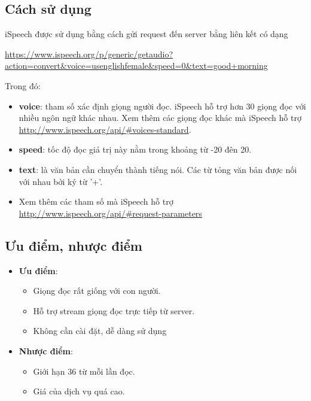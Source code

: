 \subsection{Cách sử dụng}
iSpeech được sử dụng bằng cách gửi request đến server bằng liên kết có dạng

\url{https://www.ispeech.org/p/generic/getaudio?action=convert&voice=usenglishfemale&speed=0&text=good+morning}

Trong đó:
\begin{itemize}
	\item \textbf{voice}:  tham số xác định giọng người đọc. iSpeech hỗ trợ hơn 30 giọng đọc với nhiều ngôn ngữ khác nhau. Xem thêm các giọng đọc khác mà iSpeech hỗ trợ \url{http://www.ispeech.org/api/#voices-standard}.
	\item \textbf{speed}: tốc độ đọc giá trị này nằm trong khoảng từ -20 đên 20.
	\item \textbf{text}: là văn bản cần chuyển thành tiếng nói. Các từ tỏng văn bản được nối với nhau bởi ký từ '+'.\
	\item Xem thêm các tham số mà iSpeech hỗ trợ \url{http://www.ispeech.org/api/#request-parameters}
\end{itemize}
\subsection{Ưu điểm, nhược điểm}
\begin{itemize}
	\item \textbf{Ưu điểm}:
	\begin{itemize}
		\item Giọng đọc rất giống với con người.
		\item Hỗ trợ stream giọng đọc trực tiếp từ server.
		\item Không cần cài đặt, dễ dàng sử dụng
	\end{itemize}
	\item \textbf{Nhược điểm}:
	\begin{itemize}
		\item Giới hạn 36 từ mỗi lần đọc.
		\item Giá của dịch vụ quá cao.
	\end{itemize}
\end{itemize}
